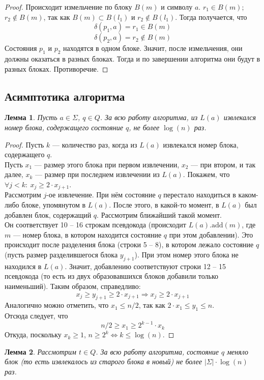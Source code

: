 \documentclass{article}
\newtheorem{lemma}{Лемма}
\begin{document}
\begin{proof}
  Происходит измельчение по блоку $B(m)$ и символу $a$. $r_1 \in B(m)$; $r_2 \notin B(m)$, так как $B(m) \subset B(l_1)$ и $r_2 \notin B(l_1)$. Тогда получается, что
  \[\delta(p_1, a) = r_1 \in B(m)\]
  \[\delta(p_2, a) = r_2 \notin B(m)\]
  Состояния $p_1$ и $p_2$ находятся в одном блоке. Значит, после измельчения, они должны оказаться в разных блоках. Тогда и по завершении алгоритма они будут в разных блоках. Противоречие.
\end{proof}
\subsection{Асимптотика алгоритма}
\begin{lemma}
  Пусть $a \in \Sigma$, $q \in Q$. За всю работу алгоритма, из $L(a)$ извлекался номер блока, содержащего состояние $q$, не более $\log(n)$ раз.   
\end{lemma}
\begin{proof}
  Пусть $k$ --- количество раз, когда из $L(a)$ извлекался номер блока, содержащего $q$.\\
  Пусть $x_1$ --- размер этого блока при первом извлечении, $x_2$ --- при втором, и так далее, $x_k$ --- размер при последнем извлечении из $L(a)$. Покажем, что $\forall j < k: \ x_j \ge 2 \cdot x_{j+1}$.\\
  Рассмотрим $j$-ое извлечение. При нём состояние $q$ перестало находиться в каком-либо блоке, упомянутом в $L(a)$. После этого, в какой-то момент, в $L(a)$ был добавлен блок, содержащий $q$. Рассмотрим ближайший такой момент.\\
  Он соответствует 10 -- 16 строкам псевдокода (происходит $L(a).\text{add}(m)$, где $m$ --- номер блока, в котором находится состояние $q$ при этом добавлении). Это происходит после разделения блока (строки 5 -- 8), в котором лежало состояние $q$ (пусть размер разделившегося блока $y_{j+1}$). При этом номер этого блока не находился в $L(a)$. Значит, добавлению соответствуют строки 12 -- 15 псевдокода (то есть из двух образовавшихся блоков добавили только наименьший). Таким образом, справедливо:
  \[x_j \ge y_{j+1} \ge 2 \cdot x_{j+1} \Rightarrow x_j \ge 2 \cdot x_{j+1}\]
  Аналогично можно отметить, что $x_1 \le n / 2$, так как $2 \cdot x_1 \le y_1 \le n$.\\
  Отсюда следует, что \[n/2 \ge x_1 \ge 2^{k-1} \cdot x_k\]
  Откуда, поскольку $x_k \ge 1$, $n \ge 2^k \Leftrightarrow k \le \log(n)$. 
\end{proof}
\begin{lemma}
  Рассмотрим $t \in Q$. За всю работу алгоритма, состояние $q$ меняло блок (то есть извлекалось из старого блока в новый) не более $|\Sigma| \cdot \log(n)$ раз.
\end{lemma}
\end{document}
